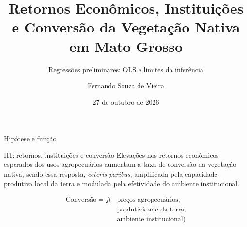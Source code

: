 \documentclass[aspectratio=169,11pt]{beamer}
\title[Retornos, instituições e conversão]{Retornos Econômicos, Instituições e Conversão da Vegetação Nativa em Mato Grosso}
\subtitle{Regressões preliminares: OLS e limites da inferência}
\author{Fernando Souza de Vieira}
\institute{Tópicos em Microeconomia}
\date{27 de outubro de 2026}
\newcommand{\fonte}[1]{\par\vfill{\fontsize{7.5}{9}\selectfont\color{gray}Fonte: #1\par}}
\newcommand{\tpar}{\par\vspace{2mm}}
\begin{document}
\begin{frame}
\titlepage
\end{frame}

\begin{frame}{Hipótese e função}
\begin{block}{H1: retornos, instituições e conversão}
Elevações nos retornos econômicos esperados dos usos agropecuários aumentam a taxa de conversão da vegetação nativa, sendo essa resposta, \textit{ceteris paribus}, amplificada pela capacidade produtiva local da terra e modulada pela efetividade do ambiente institucional.
\end{block}
\medskip
\[
\begin{aligned}
\text{Conversão}=f\bigl(&\text{preços agropecuários},\\
&\text{produtividade da terra},\\ &\text{ambiente institucional}\bigr)
\end{aligned}
\]
\end{frame}
\end{document}
